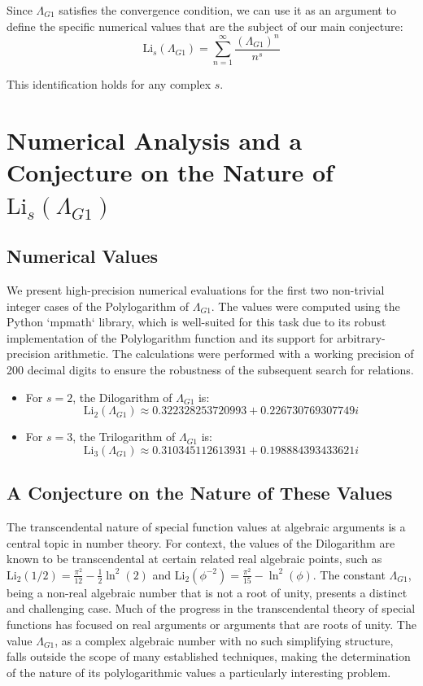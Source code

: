 \documentclass{amsart}
\theoremstyle{plain}
\theoremstyle{definition}
\theoremstyle{remark}
\newcommand{\LambdaG}{\Lambda_{G1}}
\begin{document}
Since $\LambdaG$ satisfies the convergence condition, we can use it as an argument to define the specific numerical values that are the subject of our main conjecture:
$$ \mathrm{Li}_s(\LambdaG) = \sum_{n=1}^{\infty} \frac{(\LambdaG)^{n}}{n^s} $$

This identification holds for any complex $s$.

\section{Numerical Analysis and a Conjecture on the Nature of \texorpdfstring{$\mathrm{Li}_s(\LambdaG)$}{Li\_s(Lambda\_G1)}}

\subsection{Numerical Values}
We present high-precision numerical evaluations for the first two non-trivial integer cases of the Polylogarithm of $\LambdaG$. The values were computed using the Python `mpmath` library, which is well-suited for this task due to its robust implementation of the Polylogarithm function and its support for arbitrary-precision arithmetic. The calculations were performed with a working precision of 200 decimal digits to ensure the robustness of the subsequent search for relations.
\begin{itemize}
    \item For $s=2$, the Dilogarithm of $\LambdaG$ is:
    $$ \mathrm{Li}_2(\LambdaG) \approx 0.322328253720993 + 0.226730769307749i $$
    
    \item For $s=3$, the Trilogarithm of $\LambdaG$ is:
    $$ \mathrm{Li}_3(\LambdaG) \approx 0.310345112613931 + 0.198884393433621i $$
    
\end{itemize}

\subsection{A Conjecture on the Nature of These Values}
The transcendental nature of special function values at algebraic arguments is a central topic in number theory. For context, the values of the Dilogarithm are known to be transcendental at certain related real algebraic points, such as $\mathrm{Li}_2(1/2) = \frac{\pi^2}{12} - \frac{1}{2}\ln^2(2)$ and $\mathrm{Li}_2(\phi^{-2}) = \frac{\pi^2}{15} - \ln^2(\phi)$. The constant $\LambdaG$, being a non-real algebraic number that is not a root of unity, presents a distinct and challenging case. Much of the progress in the transcendental theory of special functions has focused on real arguments or arguments that are roots of unity. The value $\Lambda_{G1}$, as a complex algebraic number with no such simplifying structure, falls outside the scope of many established techniques, making the determination of the nature of its polylogarithmic values a particularly interesting problem.
\end{document}
